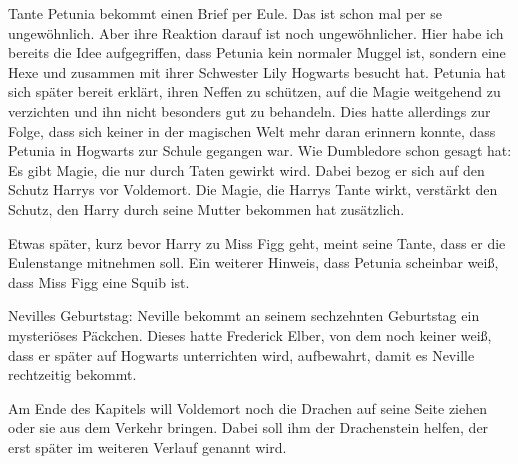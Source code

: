 \begin{kommentar}
Tante Petunia bekommt einen Brief per Eule. Das ist schon mal per se ungewöhnlich. Aber ihre Reaktion darauf ist noch ungewöhnlicher. Hier habe ich bereits die Idee aufgegriffen, dass Petunia kein normaler Muggel ist, sondern eine Hexe und zusammen mit ihrer Schwester Lily Hogwarts besucht hat. Petunia hat sich später bereit erklärt, ihren Neffen zu schützen, auf die Magie weitgehend zu verzichten und ihn nicht besonders gut zu behandeln. Dies hatte allerdings zur Folge, dass sich keiner in der magischen Welt mehr daran erinnern konnte, dass Petunia in Hogwarts zur Schule gegangen war. Wie Dumbledore schon gesagt hat: Es gibt Magie, die nur durch Taten gewirkt wird. Dabei bezog er sich auf den Schutz Harrys vor Voldemort. Die Magie, die Harrys Tante wirkt, verstärkt den Schutz, den Harry durch seine Mutter bekommen hat zusätzlich.
\end{kommentar}

\begin{kommentar}
Etwas später, kurz bevor Harry zu Miss Figg geht, meint seine Tante, dass er die Eulenstange mitnehmen soll. Ein weiterer Hinweis, dass Petunia scheinbar weiß, dass Miss Figg eine Squib ist.
\end{kommentar}

\begin{kommentar}
Nevilles Geburtstag: Neville bekommt an seinem sechzehnten Geburtstag ein mysteriöses Päckchen. Dieses hatte Frederick Elber, von dem noch keiner weiß, dass er später auf Hogwarts unterrichten wird, aufbewahrt, damit es Neville rechtzeitig bekommt.
\end{kommentar}

\begin{kommentar}
Am Ende des Kapitels will Voldemort noch die Drachen auf seine Seite ziehen oder sie aus dem Verkehr bringen. Dabei soll ihm der Drachenstein helfen, der erst später im weiteren Verlauf genannt wird.
\end{kommentar}
